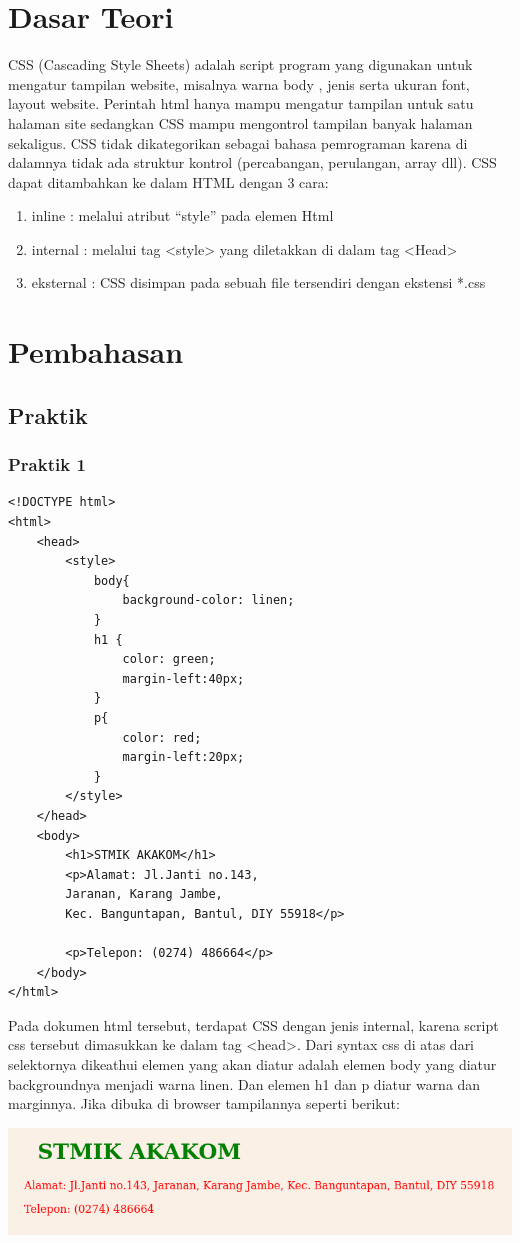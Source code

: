 \documentclass[a4paper,12pt]{article}
\begin{document}
\section{Dasar Teori}
CSS (Cascading Style Sheets) adalah script program yang digunakan untuk mengatur
tampilan website, misalnya warna body , jenis serta ukuran font, layout website.
Perintah html hanya mampu mengatur tampilan untuk satu halaman site sedangkan CSS
mampu mengontrol tampilan banyak halaman sekaligus. CSS tidak dikategorikan sebagai
bahasa pemrograman karena di dalamnya tidak ada struktur kontrol (percabangan,
perulangan, array dll). CSS dapat ditambahkan ke dalam HTML dengan 3 cara:
\begin{enumerate}[label=\alph*.]
    \item inline : melalui atribut “style” pada elemen Html
    \item internal : melalui tag <style> yang diletakkan di dalam tag <Head>
    \item eksternal : CSS disimpan pada sebuah file tersendiri dengan ekstensi *.css
\end{enumerate}

\newpage

\section{Pembahasan}
\subsection{Praktik}
\subsubsection{Praktik 1}
\begin{lstlisting}
<!DOCTYPE html>
<html>
    <head>
        <style>
            body{
                background-color: linen;
            }
            h1 {
                color: green;
                margin-left:40px;
            }
            p{
                color: red;
                margin-left:20px;
            }
        </style>
    </head>
    <body>
        <h1>STMIK AKAKOM</h1>
        <p>Alamat: Jl.Janti no.143, 
        Jaranan, Karang Jambe, 
        Kec. Banguntapan, Bantul, DIY 55918</p>

        <p>Telepon: (0274) 486664</p>
    </body>
</html>
\end{lstlisting}
Pada dokumen html tersebut, terdapat CSS dengan jenis internal, karena script css tersebut 
dimasukkan ke dalam tag <head>. Dari syntax css di atas dari selektornya dikeathui elemen 
yang akan diatur adalah elemen body yang diatur backgroundnya menjadi warna linen. Dan elemen 
h1 dan p diatur warna dan marginnya. Jika dibuka di browser tampilannya seperti berikut:
\begin{center}
    \includegraphics[width=\linewidth]{1.png}
\end{center}
\end{document}
